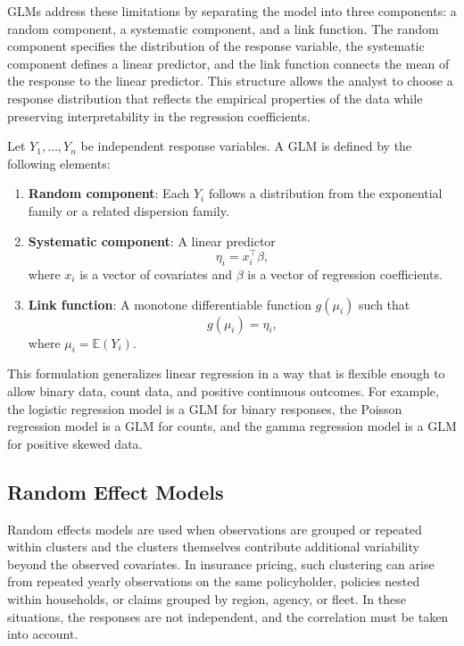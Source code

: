 \documentclass{sfuthesis}
\numberwithin{equation}{chapter}
\begin{document}
GLMs address these limitations by separating the model into three components: a random component, a systematic component, and a link function. The random component specifies the distribution of the response variable, the systematic component defines a linear predictor, and the link function connects the mean of the response to the linear predictor. This structure allows the analyst to choose a response distribution that reflects the empirical properties of the data while preserving interpretability in the regression coefficients.

Let $Y_1, \dots, Y_n$ be independent response variables. A GLM is defined by the following elements:
\begin{enumerate}
    \item \textbf{Random component}: Each $Y_i$ follows a distribution from the exponential family or a related dispersion family.
    \item \textbf{Systematic component}: A linear predictor
    \begin{equation}
        \eta_i = x_i^\top \beta,
    \end{equation}
    where $x_i$ is a vector of covariates and $\beta$ is a vector of regression coefficients.
    \item \textbf{Link function}: A monotone differentiable function $g(\mu_i)$ such that
    \begin{equation}
        g(\mu_i) = \eta_i,
    \end{equation}
    where $\mu_i = \mathbb{E}(Y_i)$.
\end{enumerate}

This formulation generalizes linear regression in a way that is flexible enough to allow binary data, count data, and positive continuous outcomes. For example, the logistic regression model is a GLM for binary responses, the Poisson regression model is a GLM for counts, and the gamma regression model is a GLM for positive skewed data.

\subsection{Random Effect Models}

Random effects models are used when observations are grouped or repeated within clusters and the clusters themselves contribute additional variability beyond the observed covariates. In insurance pricing, such clustering can arise from repeated yearly observations on the same policyholder, policies nested within households, or claims grouped by region, agency, or fleet. In these situations, the responses are not independent, and the correlation must be taken into account.
\end{document}

